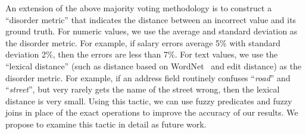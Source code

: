 An extension of the above majority voting methodology is to construct a ``disorder metric'' that indicates the distance between an incorrect value and its ground truth. For numeric values, we use the average and standard deviation as the disorder metric. For example, if salary errors average 5\% with standard deviation 2\%, then the errors are less than 7\%. For text values, we use the ``lexical distance'' (such as distance based on WordNet~\cite{WordNet,DBLP:journals/cacm/Miller95} and edit distance) as the disorder metric. For example, if an address field routinely confuses ``\textit{road}'' and ``\textit{street}'', but very rarely gets the name of the street wrong, then the lexical distance is very small. Using this tactic, we can use fuzzy predicates and fuzzy joins in place of the exact operations to improve the accuracy of our results.  We propose to examine this tactic in detail as future work.




